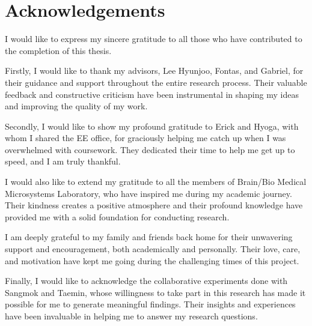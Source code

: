 \thispagestyle{main}
\chapter*{Acknowledgements}
I would like to express my sincere gratitude to all those who have contributed to the completion of this thesis.

Firstly, I would like to thank my advisors, Lee Hyunjoo, Fontas, and Gabriel, for their guidance and support throughout the entire research process. Their valuable feedback and constructive criticism have been instrumental in shaping my ideas and improving the quality of my work.

Secondly, I would like to show my profound gratitude to Erick and Hyoga, with whom I shared the EE office, for graciously helping me catch up when I was overwhelmed with coursework. They dedicated their time to help me get up to speed, and I am truly thankful.

I would also like to extend my gratitude to all the members of Brain/Bio Medical Microsystems Laboratory, who have inspired me during my academic journey. Their kindness creates a positive atmosphere and their profound knowledge have provided me with a solid foundation for conducting research.

I am deeply grateful to my family and friends back home for their unwavering support and encouragement, both academically and personally. Their love, care, and motivation have kept me going during the challenging times of this project.

Finally, I would like to acknowledge the collaborative experiments done with Sangmok and Taemin, whose willingness to take part in this research has made it possible for me to generate meaningful findings. Their insights and experiences have been invaluable in helping me to answer my research questions.
